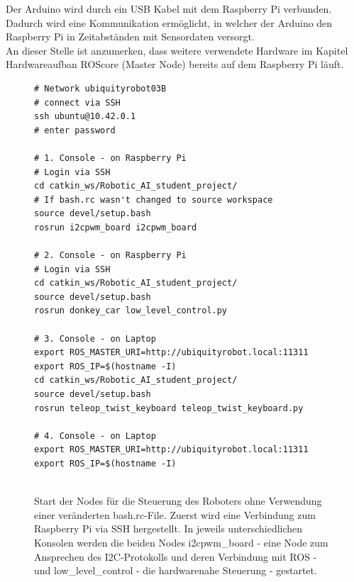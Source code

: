 \documentclass[conference]{IEEEtran}
\begin{document}
	Der Arduino wird durch ein USB Kabel mit dem Raspberry Pi verbunden.
	Dadurch wird eine Kommunikation ermöglicht, in welcher der Arduino 
	den Raspberry Pi in Zeitabständen mit Sensordaten versorgt.
	\\
	An dieser Stelle ist anzumerken, dass weitere verwendete Hardware im 
	Kapitel Hardwareaufban ROScore (Master Node) bereits auf dem 
	Raspberry Pi läuft.
	
\begin{figure}
	\centering
\begin{verbatim}
# Network ubiquityrobot03B
# connect via SSH
ssh ubuntu@10.42.0.1
# enter password
	
# 1. Console - on Raspberry Pi
# Login via SSH
cd catkin_ws/Robotic_AI_student_project/
# If bash.rc wasn't changed to source workspace
source devel/setup.bash
rosrun i2cpwm_board i2cpwm_board
	
# 2. Console - on Raspberry Pi
# Login via SSH
cd catkin_ws/Robotic_AI_student_project/
source devel/setup.bash
rosrun donkey_car low_level_control.py
	
# 3. Console - on Laptop 
export ROS_MASTER_URI=http://ubiquityrobot.local:11311
export ROS_IP=$(hostname -I)
cd catkin_ws/Robotic_AI_student_project/
source devel/setup.bash
rosrun teleop_twist_keyboard teleop_twist_keyboard.py
	
# 4. Console - on Laptop
export ROS_MASTER_URI=http://ubiquityrobot.local:11311
export ROS_IP=$(hostname -I)
	
	\end{verbatim}
	\label{StartNodes}
	\caption{Start der Nodes für die Steuerung des Roboters ohne Verwendung einer veränderten 
	bash.rc-File. Zuerst wird eine Verbindung zum Raspberry Pi via SSH 
	hergestellt. In jeweils unterschiedlichen Konsolen werden die beiden 
	Nodes i2cpwm\_board - eine Node zum Ansprechen des I2C-Protokolls und 
	deren Verbindung mit ROS - und low\_level\_control - die hardwarenahe 
	Steuerung - gestartet.}
\end{figure}
	
\end{document}
